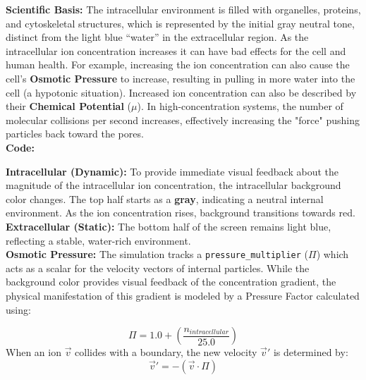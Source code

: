 \documentclass[11pt]{article}
\begin{document}
\begin{tcolorbox}[colback=cyan!5,colframe=cyan!50!black,title=Game Mechanic: Intracellular Ion Concentration]

	\textbf{Scientific Basis:} The intracellular environment is filled with organelles, proteins, and cytoskeletal structures, which is represented by the initial {\color{gray}gray} neutral tone, distinct from the {\color{HBRSblue}light blue} ``water'' in the extracellular region. As the intracellular ion concentration increases it can have bad effects for the cell and human health. For example, increasing the ion concentration can also cause the cell's \textbf{Osmotic Pressure} to increase, resulting in pulling in more water into the cell (a hypotonic situation). Increased ion concentration can also be described by their \textbf{Chemical Potential} ($\mu$). In high-concentration systems, the number of molecular collisions per second increases, effectively increasing the "force" pushing particles back toward the pores.\\

	\textbf{Code:}

	\textbf{Intracellular (Dynamic):} To provide immediate visual feedback about the magnitude of the intracellular ion concentration, the intracellular background color changes. The top half starts as a \textbf{{\color{gray}gray}}, indicating a neutral internal environment. As the ion concentration rises, background transitions towards red.\\

	\textbf{Extracellular (Static):} The bottom half of the screen remains {\color{HBRSblue}light blue}, reflecting a stable, water-rich environment.\\

	\textbf{Osmotic Pressure:}	The simulation tracks a \texttt{pressure\_multiplier} ($\Pi$) which acts as a scalar for the velocity vectors of internal particles. While the background color provides visual feedback of the concentration gradient, the physical manifestation of this gradient is modeled by a Pressure Factor calculated using:

\begin{equation}
    \Pi = 1.0 + \left( \frac{n_{intracellular}}{25.0} \right)
\end{equation}
When an ion $\vec{v}$ collides with a boundary, the new velocity $\vec{v}'$ is determined by:
\begin{equation}
    \vec{v}' = -(\vec{v} \cdot \Pi)
\end{equation}


\end{tcolorbox}
\end{document}
